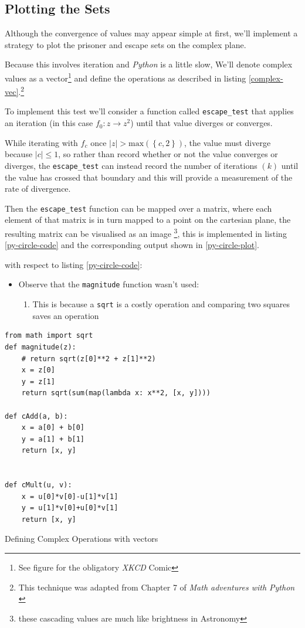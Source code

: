 \documentclass[a4paper,11pt,twoside]{article}
\begin{document}
\subsection{Plotting the Sets}
\label{sec:org2116fda}
Although the convergence of values may appear simple at first, we'll implement a
strategy to plot the prisoner and escape sets on the complex plane.

Because this involves iteration and \emph{Python} is a little slow, We'll denote
complex values as a vector\footnote{See figure for the obligatory \emph{XKCD} Comic} and define the operations as described in
listing \ref{complex-vec}.\footnote{This technique was adapted from Chapter 7 of \emph{Math adventures with Python} \cite{farrellMathAdventuresPython2019}}

To implement this test we'll consider a function called \texttt{escape\_test} that applies an
iteration (in this case \(f_{0}: z \rightarrow z^{2}\)) until that value diverges or converges.

While iterating with \(f_{c}\) once \(\left\lvert z \right\rvert >
\mathrm{max}\left(\left\{c, 2\right\}\right)\), the value must diverge because
\(\left\lvert c \right\rvert \leq 1\), so rather than record whether or not the
value converges or diverges, the \texttt{escape\_test} can instead record the number of
iterations \((k)\) until the value has crossed that boundary and this will provide
a measurement of the rate of divergence.

Then the \texttt{escape\_test} function can be mapped over a matrix, where each element
of that matrix is in turn mapped to a point on the cartesian plane, the resulting matrix
can be visualised as an image \footnote{these cascading values are much like brightness in Astronomy}, this is implemented in listing
\ref{py-circle-code} and the corresponding output shown in \ref{py-circle-plot}.

with respect to listing \ref{py-circle-code}:

\begin{itemize}
\item Observe that the \texttt{magnitude} function wasn't used:
\begin{enumerate}
\item This is because a \texttt{sqrt} is a costly operation and comparing two squares saves an operation
\end{enumerate}
\end{itemize}



\begin{listing}[htbp]
\begin{verbatim}
from math import sqrt
def magnitude(z):
    # return sqrt(z[0]**2 + z[1]**2)
    x = z[0]
    y = z[1]
    return sqrt(sum(map(lambda x: x**2, [x, y])))

def cAdd(a, b):
    x = a[0] + b[0]
    y = a[1] + b[1]
    return [x, y]


def cMult(u, v):
    x = u[0]*v[0]-u[1]*v[1]
    y = u[1]*v[0]+u[0]*v[1]
    return [x, y]
\end{verbatim}
\caption{\label{complex-vec}Defining Complex Operations with vectors}
\end{listing}
\end{document}
